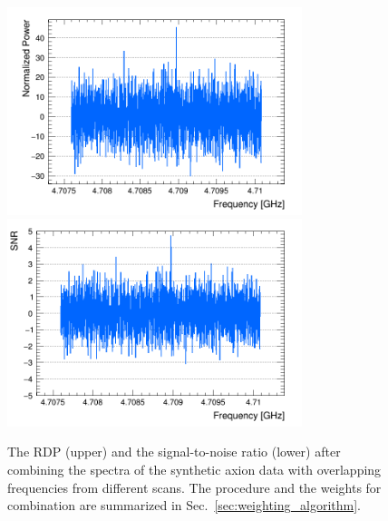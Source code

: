 \begin{figure}[htbp]                                                                                                  
    \centering                                                                                                                       
    \includegraphics[width=8.6cm]{figures/Power_CombSpectrum_FaxionRun_AllSteps_Rescan_SG4_W201.png}
    \includegraphics[width=8.6cm]{figures/SNR_CombSpectrum_FaxionRun_AllSteps_Rescan_SG4_W201.png}
    \caption{The RDP (upper) and the 
signal-to-noise ratio (lower) after combining the spectra 
of the synthetic axion data with overlapping frequencies from different scans.
 The procedure and the weights for combination are summarized in 
Sec.~\ref{sec:weighting_algorithm}.}                
\label{fig:faxioncombine}                                                                                                            
\end{figure}                       


